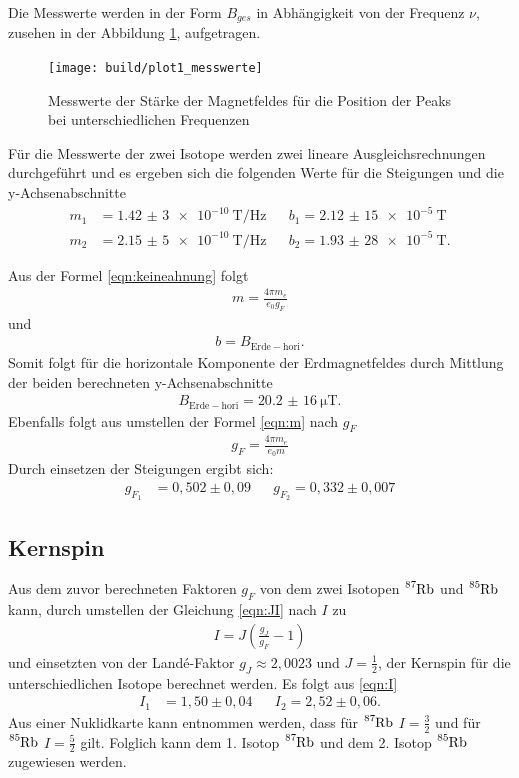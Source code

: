 Die Messwerte werden in der Form $B_{ges}$ in Abhängigkeit von der Frequenz $\nu$,
zusehen in der Abbildung \ref{fig:mess}, aufgetragen.

\begin{figure}
  \centering
  \texttt{[image: build/plot1\_messwerte]}
  \caption{Messwerte der Stärke der Magnetfeldes für die Position der Peaks bei unterschiedlichen Frequenzen}
  \label{fig:mess}
\end{figure}
\FloatBarrier
Für die Messwerte der zwei Isotope werden zwei lineare Ausgleichsrechnungen
durchgeführt und es ergeben sich die folgenden Werte für die Steigungen und die y-Achsenabschnitte
\begin{align*}
  m_1&= \SI{1,42(3)e-10}{\tesla\per\hertz}&    &b_1=\SI{2,12(15)e-5}{\tesla}\\
  m_2&= \SI{2,15(5)e-10}{\tesla\per\hertz}&    &b_2=\SI{1,93(28)e-5}{\tesla}.
\end{align*}

Aus der Formel \eqref{eqn:keineahnung} folgt
\begin{align}
m=\frac{4\pi m_e}{e_0 g_F} \label{eqn:m}
\end{align}
und
\begin{align*}
b=B_\mathrm{Erde-hori}.
\end{align*}
Somit folgt für die horizontale Komponente der Erdmagnetfeldes durch Mittlung der
beiden berechneten y-Achsenabschnitte
\begin{align*}
B_\mathrm{Erde-hori}=\SI{20,2(16)}{\micro\tesla}.
\end{align*}
Ebenfalls folgt aus umstellen der Formel \eqref{eqn:m} nach $g_F$
\begin{align}
  g_F=\frac{4\pi m_e}{e_0 m} \label{eqn:g_f}
\end{align}
Durch einsetzen der Steigungen ergibt sich:
\begin{align*}
  g_{F_1} & =0,502\pm0,09 &  & g_{F_2}=0,332\pm0,007
\end{align*}

\subsection{Kernspin}
Aus dem zuvor berechneten Faktoren $g_F$ von dem zwei Isotopen $\ce{^{87}Rb}$ und $\ce{^{85}Rb}$ kann,
durch umstellen der Gleichung \eqref{eqn:JI}
nach $I$ zu
\begin{align}
  I=J\left( \frac{g_J}{g_F}-1\right) \label{eqn:I}
\end{align}
und einsetzten von der Landé-Faktor $g_J\approx2,0023$  und $J=\frac{1}{2}$, der Kernspin für die
unterschiedlichen Isotope berechnet werden.
Es folgt aus \eqref{eqn:I}
\begin{align*}
  I_1&=1,50\pm0,04&   &I_2=2,52\pm0,06.
\end{align*}
Aus einer Nuklidkarte \cite{verhalt} kann entnommen werden, dass für
$\ce{^{87}Rb}$ $I=\frac{3}{2}$
und  für $\ce{^{85}Rb}$ $I=\frac{5}{2}$ gilt.
Folglich kann dem 1. Isotop $\ce{^{87}Rb}$ und dem  2. Isotop $\ce{^{85}Rb}$
zugewiesen werden.
